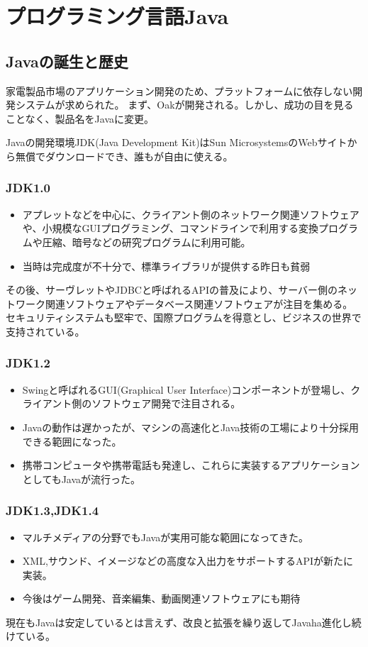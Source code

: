 \documentclass[12pt,a4j,twoside]{jsbook}
\begin{document}
\section{プログラミング言語Java}
\subsection{Javaの誕生と歴史}
家電製品市場のアプリケーション開発のため、プラットフォームに依存しない開発システムが求められた。
まず、Oakが開発される。しかし、成功の目を見ることなく、製品名をJavaに変更。

Javaの開発環境JDK(Java Development Kit)はSun MicrosystemsのWebサイトから無償でダウンロードでき、誰もが自由に使える。
\subsubsection*{JDK1.0}
\begin{itemize}
    \item アプレットなどを中心に、クライアント側のネットワーク関連ソフトウェアや、小規模なGUIプログラミング、コマンドラインで利用する変換プログラムや圧縮、暗号などの研究プログラムに利用可能。
    \item 当時は完成度が不十分で、標準ライブラリが提供する昨日も貧弱
\end{itemize}

その後、サーヴレットやJDBCと呼ばれるAPIの普及により、サーバー側のネットワーク関連ソフトウェアやデータベース関連ソフトウェアが注目を集める。
セキュリティシステムも堅牢で、国際プログラムを得意とし、ビジネスの世界で支持されている。
\subsubsection*{JDK1.2}
\begin{itemize}
    \item Swingと呼ばれるGUI(Graphical User Interface)コンポーネントが登場し、クライアント側のソフトウェア開発で注目される。
    \item Javaの動作は遅かったが、マシンの高速化とJava技術の工場により十分採用できる範囲になった。
    \item 携帯コンピュータや携帯電話も発達し、これらに実装するアプリケーションとしてもJavaが流行った。
\end{itemize}
\subsubsection*{JDK1.3,JDK1.4}
\begin{itemize}
    \item マルチメディアの分野でもJavaが実用可能な範囲になってきた。
    \item XML,サウンド、イメージなどの高度な入出力をサポートするAPIが新たに実装。
    \item 今後はゲーム開発、音楽編集、動画関連ソフトウェアにも期待
\end{itemize}
現在もJavaは安定しているとは言えず、改良と拡張を繰り返してJavaha進化し続けている。
\end{document}
